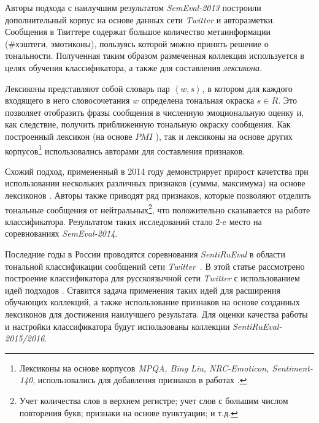    Авторы подхода с наилучшим результатом {\it SemEval-2013} \cite{tonalityAnalysis}
    построили дополнительный корпус на основе данных сети {\it Twitter} и
    авторазметки.
    Сообщения в Твиттере содержат большое количество метаинформации (\#хэштеги,
    эмотиконы), пользуясь которой можно принять решение о тональности.
    Полученная таким образом размеченная коллекция используется в целях
    обучения классификатора, а также для составления {\it лексикона}.

    Лексиконы представляют собой словарь пар $\left<w, s\right>$, в котором для каждого
    входящего в него словосочетания $w$ определена тональная окраска $s \in R$.
    Это позволяет отобразить фразы сообщения в численную эмоциональную оценку и,
    как следствие, получить приближенную тональную окраску сообщения.
    Как построенный лексикон (на основе $PMI$ \cite{lexiconSO}), так и лексиконы
    на основе других корпусов\footnote{
        Лексиконы на основе корпусов {\it MPQA, Bing Liu, NRC-Emoticon, Sentiment-140},
        использовались для добавления признаков в работах
        \cite{tonalityAnalysis,modernApproach}.
    }
    использовались авторами \cite{tonalityAnalysis} для составления признаков.

    Схожий подход, примененный в 2014 году демонстрирует прирост качетства при
    использовании нескольких различных признаков (суммы, максимума) на основе
    лексиконов \cite{modernApproach}.
    Авторы также приводят ряд признаков, которые позволяют отделить тональные
    сообщения от нейтральных\footnote{
        Учет количества слов в верхнем регистре;
        учет слов с большим числом повторения букв;
        признаки на основе пунктуации;
        и т.д.
    }, что положительно сказывается на работе классификатора.
    Результатом таких исследований стало 2-e место на соревнованиях {\it SemEval-2014}.

    Последние годы в России проводятся соревнования {\it SentiRuEval} в области
    тональной классификации сообщений сети {\it Twitter}~\cite{dialog2015,dialog2016}.
    В этой статье рассмотрено построение классификатора для русскоязычной сети
    {\it Twitter} с использованием идей подходов \cite{tonalityAnalysis, modernApproach}.
    Ставится задача применения таких идей для расширения обучающих коллекций,
    а также использование признаков на основе созданных лексиконов для
    достижения наилучшего результата.
    Для оценки качества работы и настройки классификатора будут использованы
    коллекции {\it SentiRuEval-2015/2016}.
